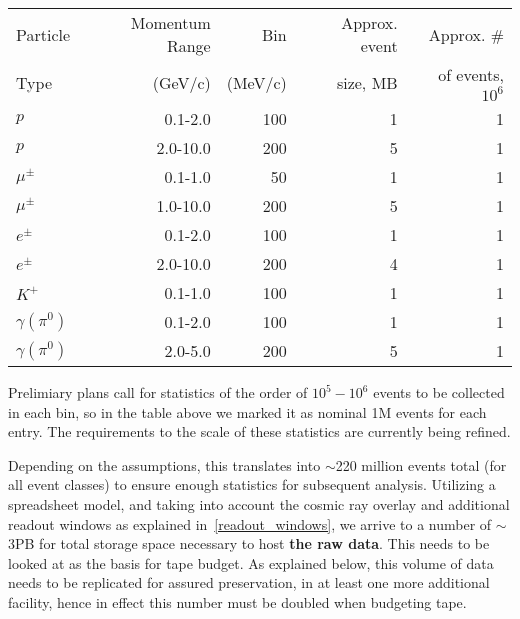 \begin{center}
\begin{tabular}[h]{|l|r|r|r|r|}
  \hline
 Particle & Momentum Range& Bin         & Approx. event & Approx. \#\\
 Type    &  (GeV/c)                 & (MeV/c) & size, MB & of events, $10^6$\\
  \hline
  $p$ & 0.1-2.0 & 100 & 1 & 1 \\
  $p$ & 2.0-10.0 & 200 & 5 & 1 \\
  \hline
   $\mu^{\pm}$ & 0.1-1.0 & 50  & 1 & 1 \\
   $\mu^{\pm}$ & 1.0-10.0 & 200  & 5 & 1 \\
  \hline
   $e^{\pm}$ & 0.1-2.0 & 100 & 1  & 1 \\
   $e^{\pm}$ & 2.0-10.0 & 200  & 4 & 1 \\
  \hline
   $K^{+}$ & 0.1-1.0 & 100 & 1  & 1 \\
  \hline
   $\gamma(\pi^{0})$ & 0.1-2.0 & 100  & 1 & 1 \\
   $\gamma(\pi^{0})$ & 2.0-5.0 & 200  & 5 & 1 \\
  \hline
\end{tabular}
\end{center}

Prelimiary plans call for statistics of the order of $10^5 - 10^6$  events to be collected in each bin, so in the table above we marked
it as nominal 1M events for each entry. The requirements to the scale of these statistics are currently being refined.

Depending on the assumptions, this translates into $\sim$220 million events total (for all event classes) to ensure enough statistics for subsequent analysis. Utilizing
a spreadsheet model, and taking into account the cosmic ray overlay and additional readout windows as explained in~\ref{readout_windows}, we arrive to a number
of $\sim$3PB for total storage space necessary to host \textbf{the raw data}. This needs to be looked at as the basis for tape budget. As explained below, this
volume of data needs to be replicated for assured preservation, in at least one more additional facility, hence in effect this number must be doubled when budgeting
tape.


